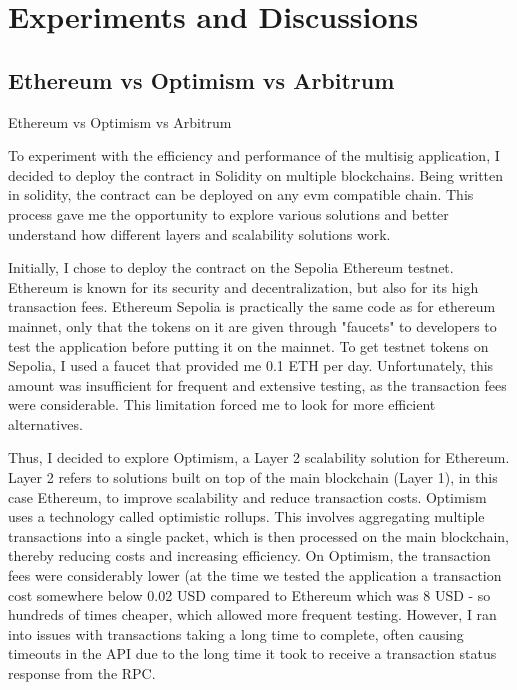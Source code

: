 \chapter{Experiments and Discussions}

\section{Ethereum vs Optimism vs Arbitrum}
\label{sec:ch5sec1}

Ethereum vs Optimism vs Arbitrum

To experiment with the efficiency and performance of the multisig application, I decided to deploy the contract in Solidity on multiple blockchains. Being written in solidity, the contract can be deployed on any evm compatible chain. This process gave me the opportunity to explore various solutions and better understand how different layers and scalability solutions work.

Initially, I chose to deploy the contract on the Sepolia Ethereum testnet. Ethereum is known for its security and decentralization, but also for its high transaction fees. Ethereum Sepolia is practically the same code as for ethereum mainnet, only that the tokens on it are given through "faucets" to developers to test the application before putting it on the mainnet.   To get testnet tokens on Sepolia, I used a faucet that provided me 0.1 ETH per day. Unfortunately, this amount was insufficient for frequent and extensive testing, as the transaction fees were considerable. This limitation forced me to look for more efficient alternatives.

Thus, I decided to explore Optimism, a Layer 2 scalability solution for Ethereum. Layer 2 refers to solutions built on top of the main blockchain (Layer 1), in this case Ethereum, to improve scalability and reduce transaction costs. Optimism uses a technology called optimistic rollups. This involves aggregating multiple transactions into a single packet, which is then processed on the main blockchain, thereby reducing costs and increasing efficiency. On Optimism, the transaction fees were considerably lower (at the time we tested the application a transaction cost somewhere below 0.02 USD compared to Ethereum which was 8 USD - so hundreds of times cheaper, which allowed more frequent testing. However, I ran into issues with transactions taking a long time to complete, often causing timeouts in the API due to the long time it took to receive a transaction status response from the RPC. 

